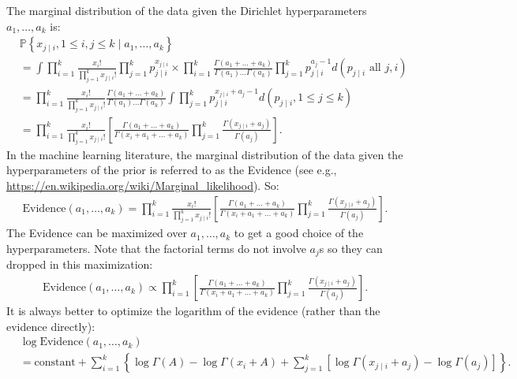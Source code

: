 \documentclass{scrartcl}
\renewcommand{\P}{{\mathbb P}}
\begin{document}
The marginal distribution of the data given the Dirichlet
hyperparameters $a_1, \dots, a_k$ is: 
\begin{align*}
&  \P \left\{x_{j \mid i}, 1 \leq i, j \leq k \mid a_1, \dots, a_k
  \right\} \\
&= \int \prod_{i=1}^k  \frac{x_i!}{\prod_{j=1}^k x_{j \mid
  i}!} \prod_{j=1}^k p_{j \mid i}^{x_{j \mid i}} \times \prod_{i=1}^k
  \frac{\Gamma(a_1 + \dots + a_k)}{\Gamma(a_1) \dots \Gamma(a_k)}
  \prod_{j=1}^k p_{j \mid i}^{a_j - 1} d(p_{j \mid i} \text{ all } j,
  i) \\
&=    \prod_{i=1}^k \frac{x_i!}{\prod_{j=1}^k x_{j \mid
  i}!} \frac{\Gamma(a_1 + \dots + a_k)}{\Gamma(a_1) \dots \Gamma(a_k)}
  \int \prod_{j=1}^k p_{j \mid i}^{x_{j \mid i} + a_j - 1} d(p_{j \mid
  i}, 1 \leq j \leq k)\\
&=  \prod_{i=1}^k \frac{x_i!}{\prod_{j=1}^k x_{j \mid
  i}!}\left[\frac{\Gamma(a_1 + \dots + 
  a_k)}{\Gamma(x_i + a_1 + \dots + a_k)} \prod_{j=1}^k
  \frac{\Gamma(x_{j \mid i} + a_j)}{\Gamma(a_j)} \right]. 
\end{align*}
In the machine learning literature, the marginal distribution of the
data given the hyperparameters of the prior is referred to as the
Evidence (see e.g.,
\url{https://en.wikipedia.org/wiki/Marginal_likelihood}). So: 
\begin{align*}
  \text{Evidence}(a_1, \dots, a_k) = \prod_{i=1}^k \frac{x_i!}{\prod_{j=1}^k x_{j \mid
  i}!}\left[\frac{\Gamma(a_1 + \dots + 
  a_k)}{\Gamma(x_i + a_1 + \dots + a_k)} \prod_{j=1}^k
  \frac{\Gamma(x_{j \mid i} + a_j)}{\Gamma(a_j)} \right]. 
\end{align*}
The Evidence can be maximized over $a_1, \dots, a_k$ to get a good
choice of 
the hyperparameters. Note that the factorial terms do not involve $
a_j$s so they can dropped in this maximization:
\begin{align*}
 \text{Evidence}(a_1, \dots, a_k) \propto \prod_{i=1}^k \left[\frac{\Gamma(a_1 + \dots + 
  a_k)}{\Gamma(x_i + a_1 + \dots + a_k)} \prod_{j=1}^k
  \frac{\Gamma(x_{j \mid i} + a_j)}{\Gamma(a_j)} \right]. 
\end{align*}
It is always better to optimize the logarithm of the evidence (rather than the
evidence directly):
\begin{align*}
 & \log \text{Evidence}(a_1, \dots, a_k) \\ &= \text{constant} + \sum_{i=1}^k \left\{ \log \Gamma(A) - \log \Gamma(x_i + A) +
  \sum_{j=1}^k \left[ \log \Gamma(x_{j \mid i} + a_j) - \log
                \Gamma(a_j) \right] \right\}. 
\end{align*}
\end{document}
